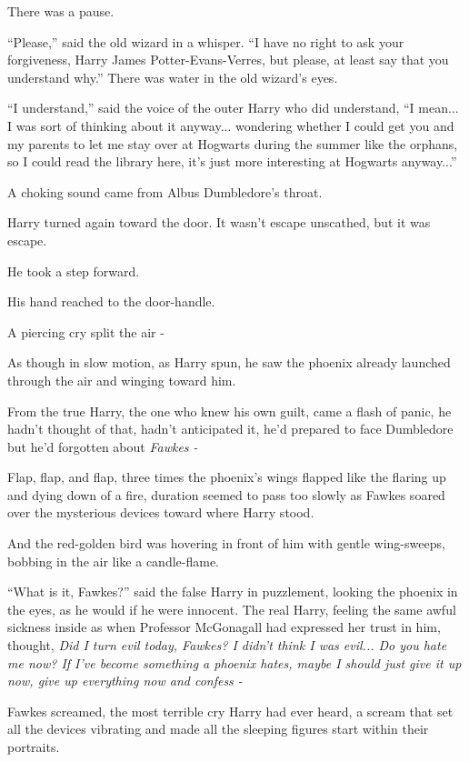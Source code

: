 There was a pause.

``Please,'' said the old wizard in a whisper. ``I have no right to ask your forgiveness, Harry James Potter-Evans-Verres, but please, at least say that you understand why.'' There was water in the old wizard's eyes.

``I understand,'' said the voice of the outer Harry who did understand, ``I mean... I was sort of thinking about it anyway... wondering whether I could get you and my parents to let me stay over at Hogwarts during the summer like the orphans, so I could read the library here, it's just more interesting at Hogwarts anyway...''

A choking sound came from Albus Dumbledore's throat.

Harry turned again toward the door. It wasn't escape unscathed, but it was escape.

He took a step forward.

His hand reached to the door-handle.

A piercing cry split the air -

As though in slow motion, as Harry spun, he saw the phoenix already launched through the air and winging toward him.

From the true Harry, the one who knew his own guilt, came a flash of panic, he hadn't thought of that, hadn't anticipated it, he'd prepared to face Dumbledore but he'd forgotten about \emph{Fawkes -}

Flap, flap, and flap, three times the phoenix's wings flapped like the flaring up and dying down of a fire, duration seemed to pass too slowly as Fawkes soared over the mysterious devices toward where Harry stood.

And the red-golden bird was hovering in front of him with gentle wing-sweeps, bobbing in the air like a candle-flame.

``What is it, Fawkes?'' said the false Harry in puzzlement, looking the phoenix in the eyes, as he would if he were innocent. The real Harry, feeling the same awful sickness inside as when Professor McGonagall had expressed her trust in him, thought, \emph{Did I turn evil today, Fawkes? I didn't think I was evil... Do you hate me now? If I've become something a phoenix hates, maybe I should just give it up now, give up everything now and confess -}

Fawkes screamed, the most terrible cry Harry had ever heard, a scream that set all the devices vibrating and made all the sleeping figures start within their portraits.

